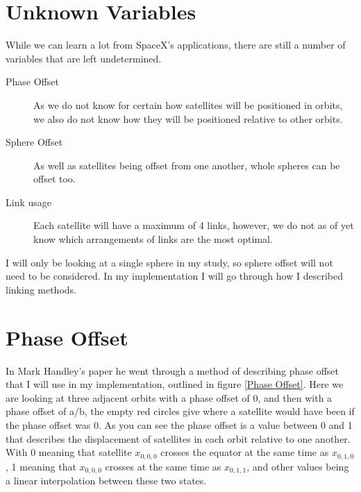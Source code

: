 \documentclass[12pt,a4paper,twoside,openright]{report}
\begin{document}
\section{Unknown Variables}
While we can learn a lot from SpaceX's applications, there are still a number of variables that are left undetermined. 

\begin{description}	
\item[Phase Offset]
As we do not know for certain how satellites will be positioned in orbits, we also do not know how they will be positioned relative to other orbits.
\item[Sphere Offset]
As well as satellites being offset from one another, whole spheres can be offset too.
\item[Link usage]
Each satellite will have a maximum of 4 links, however, we do not as of yet know which arrangements of links are the most optimal.
\end{description}

I will only be looking at a single sphere in my study, so sphere offset will not need to be considered. In my implementation I will go through how I described linking methods. 

\section{Phase Offset}
In Mark Handley's paper he went through a method of describing phase offset that I will use in my implementation, outlined in figure \ref{Phase Offset}. Here we are looking at three adjacent orbits with a phase offset of 0, and then with a phase offset of a/b, the empty red circles give where a satellite would have been if the phase offset was 0. As you can see the phase offset is a value between 0 and 1 that describes the displacement of satellites in each orbit relative to one another. With 0 meaning that satellite $x_{0,0,0}$ crosses the equator at the same time as $x_{0,1,0}$, 1 meaning that $x_{0,0,0}$ crosses at the same time as $x_{0,1,1}$, and other values being a linear interpolation between these two states.
\end{document}
